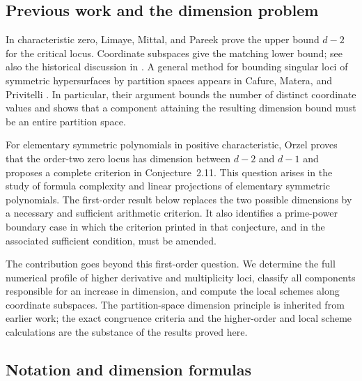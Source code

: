 \documentclass[11pt]{article}
\theoremstyle{remark}
\begin{document}
\subsection{Previous work and the dimension problem}

In characteristic zero, Limaye, Mittal, and Pareek
\cite[Lemma~13]{LMP} prove the upper bound $d-2$ for the critical
locus. Coordinate subspaces give the matching lower bound; see also
the historical discussion in \cite{Orzel}. A general method for bounding
singular loci of symmetric hypersurfaces by partition spaces appears
in Cafure, Matera, and Privitelli \cite[Theorem~3.1 and Remark~3.2]{CMP}.
In particular, their argument bounds the number of distinct coordinate
values and shows that a component attaining the resulting dimension
bound must be an entire partition space.

For elementary symmetric polynomials in positive characteristic,
Orzel \cite{Orzel} proves that the order-two zero locus has dimension
between $d-2$ and $d-1$ and proposes a complete criterion in
Conjecture~2.11. This question arises in the study of formula
complexity and linear projections of elementary symmetric polynomials.
The first-order result below replaces the two possible dimensions by
a necessary and sufficient arithmetic criterion. It also identifies
a prime-power boundary case in which the criterion printed in that
conjecture, and in the associated sufficient condition, must be amended.

The contribution goes beyond this first-order question. We determine
the full numerical profile of higher derivative and multiplicity
loci, classify all components responsible for an increase in
dimension, and compute the local schemes along coordinate subspaces.
The partition-space dimension principle is inherited from earlier
work; the exact congruence criteria and the higher-order and local
scheme calculations are the substance of the results proved here.

\subsection{Notation and dimension formulas}
\end{document}
